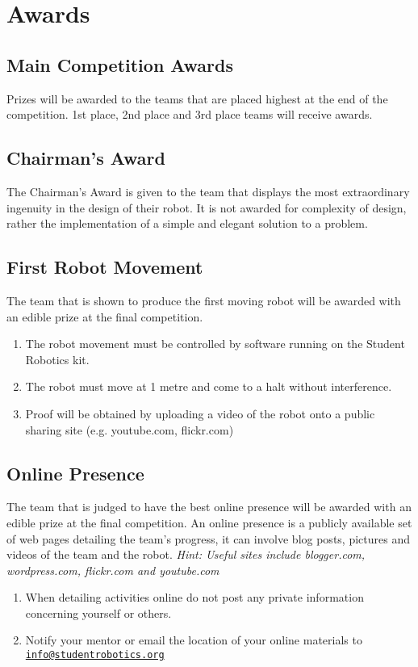 \section {Awards}
\label{sec:Awards}

\subsection{Main Competition Awards}
Prizes will be awarded to the teams that are placed highest at the end of the competition. 1st place, 2nd place and 3rd place teams will receive awards.

\subsection{Chairman's Award}
The Chairman's Award is given to the team that displays the most extraordinary ingenuity in the design of their robot. It is not awarded for complexity of design, rather the implementation of a simple and elegant solution to a problem.

\subsection{First Robot Movement}
The team that is shown to produce the first moving robot will be awarded with an edible prize at the final competition.
\begin{enumerate}
\item The robot movement must be controlled by software running on the Student Robotics kit.
\item The robot must move at 1 metre and come to a halt without interference.
\item Proof will be obtained by uploading a video of the robot onto a public sharing site (e.g. youtube.com, flickr.com)
\end{enumerate}


\subsection{Online Presence}
The team that is judged to have the best online presence will be awarded with an edible prize at the final competition.  An online presence is a publicly available set of web pages detailing the team's progress, it can involve blog posts, pictures and videos of the team and the robot.  \emph{Hint: Useful sites include blogger.com, wordpress.com, flickr.com and youtube.com}
\begin{enumerate}
\item When detailing activities online do not post any private information concerning yourself or others.
\item Notify your mentor or email the location of your online materials to \linebreak\href{mailto:info@studentrobotics.org}{\nolinkurl{info@studentrobotics.org}}
\end{enumerate}
